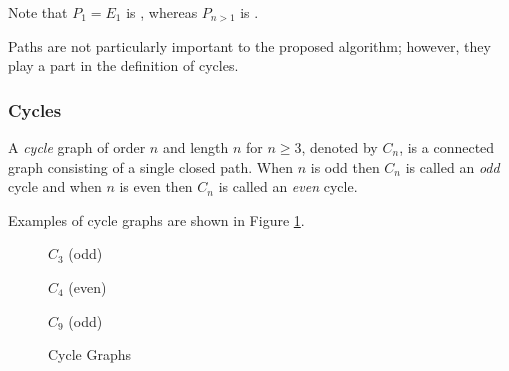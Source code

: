 Note that \(P_1=E_1\) is , whereas \(P_{n>1}\) is .

Paths are not particularly important to the proposed algorithm; however, they play a part in the definition of
cycles.

\subsubsection{Cycles}

A \emph{cycle} graph of order \(n\) and length \(n\) for \(n\ge3\), denoted by \(C_n\), is a connected graph
consisting of a single closed path.  When \(n\) is odd then \(C_n\) is called an \emph{odd} cycle and when \(n\) is
even then \(C_n\) is called an \emph{even} cycle.

Examples of cycle graphs are shown in Figure \ref{fig:cycle}.

\begin{figure}[h]
  \label{fig:cycle}
  \begin{minipage}{2in}
    \begin{center}

      \bigskip

      \(C_3\) (odd)
    \end{center}
  \end{minipage}
  \begin{minipage}{2in}
    \begin{center}

      \bigskip

      \(C_4\) (even)
    \end{center}
  \end{minipage}
  \begin{minipage}{2in}
    \begin{center}

      \bigskip

      \(C_9\) (odd)
    \end{center}
  \end{minipage}
  \caption{Cycle Graphs}
\end{figure}

